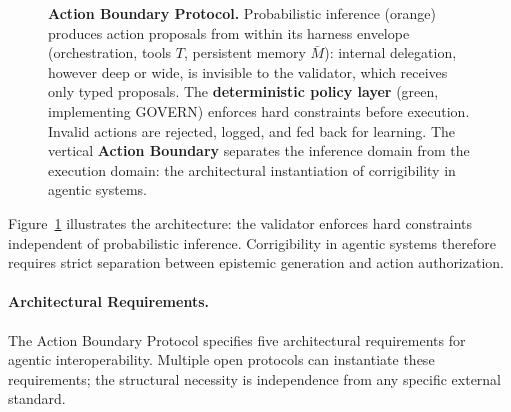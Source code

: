 \documentclass{article}
\theoremstyle{definition}
\begin{document}
\begin{figure}[htbp]
\begin{tikzpicture}
\end{tikzpicture}
\caption{\textbf{Action Boundary Protocol.} Probabilistic inference (orange) produces action proposals from within its harness envelope (orchestration, tools $T$, persistent memory $\bar{M}$): internal delegation, however deep or wide, is invisible to the validator, which receives only typed proposals. The \textbf{deterministic policy layer} (green, implementing GOVERN) enforces hard constraints before execution. Invalid actions are rejected, logged, and fed back for learning. The vertical \textbf{Action Boundary} separates the inference domain from the execution domain: the architectural instantiation of corrigibility in agentic systems.}
\label{fig:action-boundary}
\end{figure}

Figure~\ref{fig:action-boundary} illustrates the architecture: the validator enforces hard constraints independent of probabilistic inference. Corrigibility in agentic systems therefore requires strict separation between epistemic generation and action authorization.

\paragraph{Architectural Requirements.} The Action Boundary Protocol specifies five architectural requirements for agentic interoperability. Multiple open protocols can instantiate these requirements; the structural necessity is independence from any specific external standard.
\end{document}
